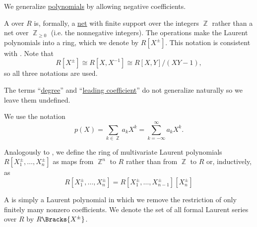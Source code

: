 \begin{definition}\label{def:laurent_polynomial}
  We generalize \hyperref[def:polynomial]{polynomials} by allowing negative coefficients.

  \begin{thmenum}
     A  over \( R \) is, formally, a \hyperref[def:topological_net]{net} with finite support over the integers \( \BbbZ \) rather than a net over \( \BbbZ_{\geq 0} \) (i.e. the nonnegative integers). The operations  make the Laurent polynomials into a ring, which we denote by \( R[X^\pm] \). This notation is consistent with . Note that
    \begin{equation*}
      R[X^\pm] \cong R[X, X^{-1}] \cong R[X, Y] / (XY - 1),
    \end{equation*}
    so all three notations are used.

    The terms \enquote{\hyperref[def:polynomial/degree]{degree}} and \enquote{\hyperref[def:polynomial/leading_coefficient]{leading coefficient}} do not generalize naturally so we leave them undefined.

    We use the notation
    \begin{equation*}
      p(X) = \sum_{k \in \BbbZ} a_k X^k = \sum_{k=-\infty}^\infty a_k X^k.
    \end{equation*}

     Analogously to , we define the ring of multivariate Laurent polynomials \( R[X_1^\pm, \ldots, X_n^\pm] \) as maps from \( \BbbZ^n \) to \( R \) rather than from \( \BbbZ \) to \( R \) or, inductively, as
    \begin{equation*}
      R[X_1^\pm, \ldots, X_n^\pm] = R[X_1^\pm, \ldots, X_{n-1}^\pm][X_n^\pm]
    \end{equation*}

     A  is simply a Laurent polynomial in which we remove the restriction of only finitely many nonzero coefficients. We denote the set of all formal Laurent series over \( R \) by \( R\Bracks{X^\pm} \).
  \end{thmenum}
\end{definition}

